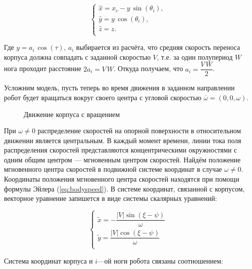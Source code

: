 \begin{equation}
\left\{
\begin{array}{lcr}
\hat{x} = x_c-y\,\sin(\theta_i),\\
\hat{y} = y\,\cos(\theta_i),\\
\hat{z} = z.\\
\end{array}
\right.
\end{equation}

Где $y = a_i\,\cos(\tau)$, $a_i$ выбирается из расчёта, что средняя скорость переноса корпуса должна совпадать с заданной скоростью $V$, т.е. за один полупериод $W$ нога проходит расстояние $2a_i=V\,W$. Откуда получаем, что $a_i = \dfrac{V\,W}{2}$.


Усложним модель, пусть теперь во время движения в заданном направлении робот будет вращаться вокруг своего центра с угловой скоростью $\overline{\omega}=(0,0,\omega)$. 

\begin{figure}[h]
\caption{Движение корпуса с вращением}
\end{figure}

При $\omega\neq0$ распределение скоростей на опорной поверхности в относительном движении является центральным. В каждый момент времени, линии тока поля распределения скоростей представляются концентрическими окружностями с одним общим центром --- мгновенным центром скоростей. 
Найдём положение мгновенного центра скоростей в подвижной системе координат в случае $\omega \neq 0$. Координаты положения мгновенного центра скоростей находятся при помощи формулы Эйлера (\ref{eq:bodyspeed}). В системе координат, связанной с корпусом, векторное уравнение запишется в виде системы скалярных уравнений:

\begin{equation}
\left\{
\begin{array}{lcr}
\tilde{x} = -\dfrac{|V|\sin(\xi-\psi)}{\omega}\\
\tilde{y} = \dfrac{|V|\cos(\xi-\psi)}{\omega}\\
\end{array}
\right.
\label{eq:speedcenter}
\end{equation}
 
Система координат корпуса и $i$---ой ноги робота связаны соотношением:
 
